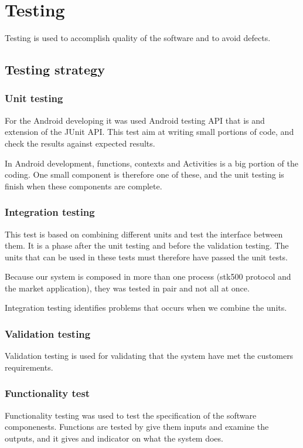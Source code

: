 \section{Testing}
	Testing is used to accomplish quality of the software and to avoid defects.
	
	\subsection{Testing strategy}

		\subsubsection{Unit testing}
			For the Android developing it was used Android testing API that is and extension of the JUnit API.
			This test aim at writing small portions of code, and check the results against expected results.

			In Android development, functions, contexts and Activities is a big portion of the coding.
			One small component is therefore one of these, and the unit testing is finish when these components are complete.

		\subsubsection{Integration testing}
			This test is based on combining different units and test the interface between them. It is a phase after the unit testing and before the validation testing. The units that can be used in these tests must therefore have passed the unit tests.

			Because our system is composed in more than one process (stk500 protocol and the market application), they 
			was tested in pair and not all at once.

			Integration testing identifies problems that occurs when we combine the units.

		\subsubsection{Validation testing}
			Validation testing is used for validating that the system have met the customers requirements.

		\subsubsection{Functionality test}
			Functionality testing was used to test the specification of the software componenests.
			Functions are tested by give them inputs and examine the outputs, and it gives and indicator on what the system does.\\

